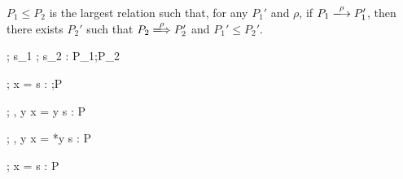 \begin{myDef}[Subtyping]
\(P_1 \le P_2\) is the largest relation such that, for any \(P_1'\)
and \(\rho\), if \(P_1 \xlongrightarrow{\rho} P_1'\), then there
exists \(P_2'\) such that \(P_2 \xLongrightarrow{\rho} P_2'\) and
\(P_1' \le P_2'\).
\label{df:subtype}
\end{myDef}


\begin{minipage}{\textwidth}

\begin{minipage}{0.5\textwidth}
\end{minipage}
\begin{minipage}{0.5\textwidth}
{\Theta ; \Gamma \vdash s_{1} ; s_{2} : P_{1};P_{2} }
\end{minipage}

\vspace{2mm}

\begin{minipage}{0.5\textwidth}
\end{minipage}
\begin{minipage}{0.5\textwidth}
\end{minipage}

\vspace{2mm}

\begin{minipage}{0.5\textwidth}
{\Theta ; \Gamma \vdash \LET x = \MALLOC \; \IN s  : \Malloc;P}
\end{minipage}
\begin{minipage}{0.5\textwidth}
{\Theta ; \Gamma, y \vdash \LET x = y \; \IN s : P}
\end{minipage}

\vspace{2mm}

\begin{minipage}{0.5\textwidth}
{\Theta ; \Gamma, y \vdash \LET x = *y \; \IN s : P}
\end{minipage}
\begin{minipage}{0.5\textwidth}
{\Theta ; \Gamma \vdash \LET x =  \; \IN s : P}
\end{minipage}


\end{minipage}
